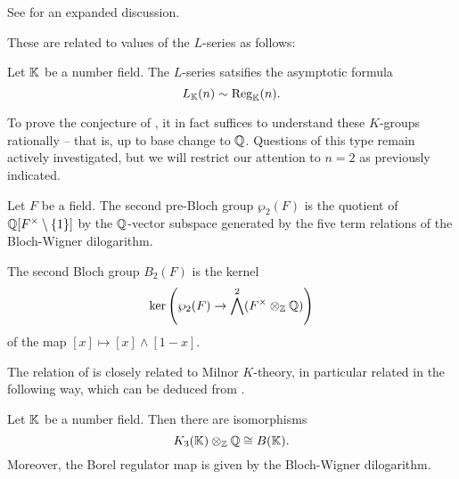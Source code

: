\begin{remark}
    See \cite[\S IV.1.18.1]{Weibel} for an expanded discussion.
\end{remark}
These are related to values of the $L$-series as follows:
\begin{theorem}\label{thm: Borel regulator and L-function}
    Let $\mathbb{K}$ be a number field. The $L$-series satsifies the asymptotic formula 
    \begin{equation}\label{eqn: L-series asymptotic formula}
        L_{\mathbb{K}}(n)\sim\mathrm{Reg}_{\mathbb{K}}(n).
    \end{equation}
\end{theorem}
To prove the conjecture of , it in fact suffices to understand these $K$-groups rationally -- that is, up to base change to $\mathbb{Q}$. Questions of this type remain actively investigated, but we will restrict our attention to $n=2$ as previously indicated. 
\begin{definition}\label{def: pre-Bloch group}
    Let $F$ be a field. The second pre-Bloch group $\wp_{2}(F)$ is the quotient of $\mathbb{Q}[F^{\times}\setminus\{1\}]$ by the $\mathbb{Q}$-vector subspace generated by the five term relations of the Bloch-Wigner dilogarithm. 
\end{definition}
\begin{definition}\label{def: Bloch group}
    The second Bloch group $B_{2}(F)$ is the kernel 
    $$\ker\left(\wp_{2}(F)\to\bigwedge^{2}(F^{\times}\otimes_{\mathbb{Z}}\mathbb{Q})\right)$$
    of the map $[x]\mapsto[x]\wedge[1-x]$. 
\end{definition}
The relation of  is closely related to Milnor $K$-theory, in particular related in the following way, which can be deduced from \cite[\S 1.5, Thm. 8]{KThyHandbook}.
\begin{theorem}[Bloch]\label{thm: Bloch rational computation of K3}
    Let $\mathbb{K}$ be a number field. Then there are isomorphisms
    $$K_{3}(\mathbb{K})\otimes_{\mathbb{Z}}\mathbb{Q}\cong B(\mathbb{K}).$$
    Moreover, the Borel regulator map is given by the Bloch-Wigner dilogarithm. 
\end{theorem}
